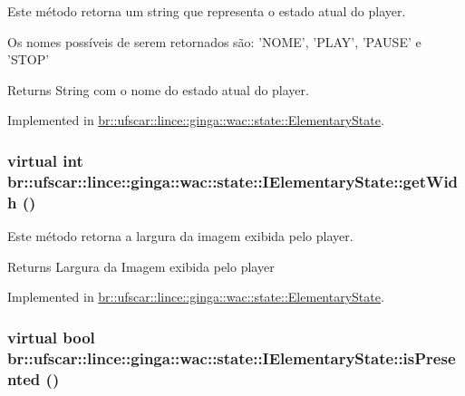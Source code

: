 Este método retorna um string que representa o estado atual do player. 

Os nomes possíveis de serem retornados são: 'NOME', 'PLAY', 'PAUSE' e 'STOP' \begin{DoxyReturn}{Returns}
String com o nome do estado atual do player. 
\end{DoxyReturn}


Implemented in \hyperlink{classbr_1_1ufscar_1_1lince_1_1ginga_1_1wac_1_1state_1_1ElementaryState_ae1c2e7da72253acf9b5c19754994047c}{br::ufscar::lince::ginga::wac::state::ElementaryState}.

\hypertarget{classbr_1_1ufscar_1_1lince_1_1ginga_1_1wac_1_1state_1_1IElementaryState_a13218fa1e799a3aabc8f20ffd7c134f5}{
\subsubsection[{getWidh}]{\setlength{\rightskip}{0pt plus 5cm}virtual int br::ufscar::lince::ginga::wac::state::IElementaryState::getWidh ()}}
\label{classbr_1_1ufscar_1_1lince_1_1ginga_1_1wac_1_1state_1_1IElementaryState_a13218fa1e799a3aabc8f20ffd7c134f5}


Este método retorna a largura da imagem exibida pelo player. 

\begin{DoxyReturn}{Returns}
Largura da Imagem exibida pelo player 
\end{DoxyReturn}


Implemented in \hyperlink{classbr_1_1ufscar_1_1lince_1_1ginga_1_1wac_1_1state_1_1ElementaryState_adf39d11c81458c2b636b797821a81fc3}{br::ufscar::lince::ginga::wac::state::ElementaryState}.

\hypertarget{classbr_1_1ufscar_1_1lince_1_1ginga_1_1wac_1_1state_1_1IElementaryState_a2d7a7f8c9945df9ad15d87863a1d288e}{
\subsubsection[{isPresented}]{\setlength{\rightskip}{0pt plus 5cm}virtual bool br::ufscar::lince::ginga::wac::state::IElementaryState::isPresented ()}}
\label{classbr_1_1ufscar_1_1lince_1_1ginga_1_1wac_1_1state_1_1IElementaryState_a2d7a7f8c9945df9ad15d87863a1d288e}



